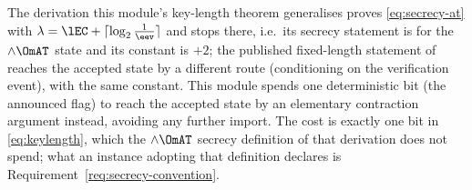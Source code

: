 
\begin{remark}
\label{rem:plus2}
The derivation this module's key-length theorem generalises proves
\eqref{eq:secrecy-at} with $\lambda=\lEC+\lceil\log_2\frac1{\eev}\rceil$ and
stops there, i.e.\ its secrecy statement is for the $\wedge\OmAT$ state and
its constant is $+2$; the published fixed-length statement of
\cite[Thm.~7, Eq.~(44)]{kamin2025renyi} reaches the accepted state by a
different route (conditioning on the verification event), with the same
constant. This module spends one deterministic bit (the announced flag) to
reach the accepted state by an elementary contraction argument instead,
avoiding any further import. The cost is exactly one bit in
\eqref{eq:keylength}, which the $\wedge\OmAT$ secrecy definition of that
derivation does not spend; what an instance adopting that definition declares
is Requirement~\ref{req:secrecy-convention}.
\end{remark}
